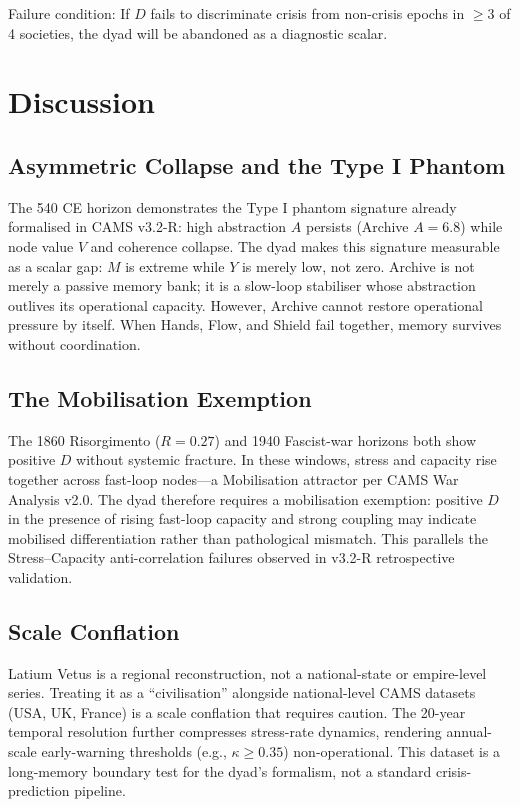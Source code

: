 \documentclass[11pt,a4paper]{article}
\begin{document}
Failure condition: If \(D\) fails to discriminate crisis from non-crisis epochs in \(\geq3\) of 4 societies, the dyad will be abandoned as a diagnostic scalar.

\section{Discussion}

\subsection{Asymmetric Collapse and the Type I Phantom}
The 540 CE horizon demonstrates the Type I phantom signature already formalised in CAMS v3.2-R: high abstraction \(A\) persists (Archive \(A=6.8\)) while node value \(V\) and coherence collapse. The dyad makes this signature measurable as a scalar gap: \(M\) is extreme while \(Y\) is merely low, not zero. Archive is not merely a passive memory bank; it is a slow-loop stabiliser whose abstraction outlives its operational capacity. However, Archive cannot restore operational pressure by itself. When Hands, Flow, and Shield fail together, memory survives without coordination.

\subsection{The Mobilisation Exemption}
The 1860 Risorgimento (\(R=0.27\)) and 1940 Fascist-war horizons both show positive \(D\) without systemic fracture. In these windows, stress and capacity rise together across fast-loop nodes---a Mobilisation attractor per CAMS War Analysis v2.0. The dyad therefore requires a mobilisation exemption: positive \(D\) in the presence of rising fast-loop capacity and strong coupling may indicate mobilised differentiation rather than pathological mismatch. This parallels the Stress--Capacity anti-correlation failures observed in v3.2-R retrospective validation.

\subsection{Scale Conflation}
Latium Vetus is a regional reconstruction, not a national-state or empire-level series. Treating it as a ``civilisation'' alongside national-level CAMS datasets (USA, UK, France) is a scale conflation that requires caution. The 20-year temporal resolution further compresses stress-rate dynamics, rendering annual-scale early-warning thresholds (e.g., \(\kappa\geq0.35\)) non-operational. This dataset is a long-memory boundary test for the dyad's formalism, not a standard crisis-prediction pipeline.
\end{document}
